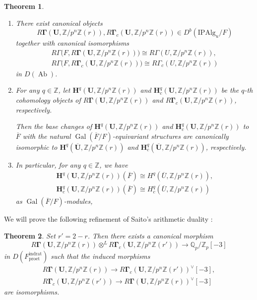 \documentclass{amsart}
\newtheorem{Thm}{Theorem}[subsection]
\theoremstyle{remark}
\numberwithin{equation}{subsection}
\newcommand{\tensor}{\mathbin{\otimes}}
\newcommand{\closure}[1]{\overline{#1}}
\newcommand{\Z}{\mathbb{Z}}
\newcommand{\Q}{\mathbb{Q}}
\newcommand{\et}{\mathrm{et}}
\newcommand{\rat}{\mathrm{rat}}
\newcommand{\ind}{\mathrm{ind}}
\newcommand{\pro}{\mathrm{pro}}
\newcommand{\Alg}{\mathrm{Alg}}
\newcommand{\Ind}{\mathrm{I}}
\newcommand{\Pro}{\mathrm{P}}
\newcommand{\alg}[1]{\mathbf{#1}}
\DeclareMathOperator{\Gal}{Gal}
\DeclareMathOperator{\Ab}{Ab}
\begin{document}
\begin{Thm} \label{0128} \mbox{}
	\begin{enumerate}
		\item \label{0129}
			There exist canonical objects
				\[
						R \alg{\Gamma}(\alg{U}, \Z / p^{n} \Z(r)),
						R \alg{\Gamma}_{c}(\alg{U}, \Z / p^{n} \Z(r))
					\in
						D^{b}(\Ind \Pro \Alg_{u} / F)
				\]
			together with canonical isomorphisms
				\begin{gather*}
							R \Gamma \bigl(
								F,
								R \alg{\Gamma}(\alg{U}, \Z / p^{n} \Z(r))
							\bigr)
						\cong
							R \Gamma(U, \Z / p^{n} \Z(r)),
					\\
							R \Gamma \bigl(
								F,
								R \alg{\Gamma}_{c}(\alg{U}, \Z / p^{n} \Z(r))
							\bigr)
						\cong
							R \Gamma_{c}(U, \Z / p^{n} \Z(r))
				\end{gather*}
			in $D(\Ab)$.
		\item \label{0130}
			For any $q \in \Z$,
			let $\alg{H}^{q}(\alg{U}, \Z / p^{n} \Z(r))$ and $\alg{H}^{q}_{c}(\alg{U}, \Z / p^{n} \Z(r))$
			be the $q$-th cohomology objects
			of $R \alg{\Gamma}(\alg{U}, \Z / p^{n} \Z(r))$ and $R \alg{\Gamma}_{c}(\alg{U}, \Z / p^{n} \Z(r))$,
			respectively.
			
			Then the base changes of $\alg{H}^{q}(\alg{U}, \Z / p^{n} \Z(r))$
			and $\alg{H}_{c}^{q}(\alg{U}, \Z / p^{n} \Z(r))$ to $\closure{F}$
			with the natural $\Gal(\closure{F} / F)$-equivariant structures
			are canonically isomorphic to
			$\alg{H}^{q}(\closure{\alg{U}}, \Z / p^{n} \Z(r))$
			and $\alg{H}_{c}^{q}(\closure{\alg{U}}, \Z / p^{n} \Z(r))$,
			respectively.
		\item \label{0131}
			In particular, for any $q \in \Z$, we have
				\begin{gather*}
							\alg{H}^{q}(\alg{U}, \Z / p^{n} \Z(r))(\closure{F})
						\cong
							H^{q}(\closure{U}, \Z / p^{n} \Z(r)),
					\\
							\alg{H}^{q}_{c}(\alg{U}, \Z / p^{n} \Z(r))(\closure{F})
						\cong
							H^{q}_{c}(\closure{U}, \Z / p^{n} \Z(r))
				\end{gather*}
			as $\Gal(\closure{F} / F)$-modules,
	\end{enumerate}
\end{Thm}

We will prove the following refinement of Saito's arithmetic duality
\cite{Sai86,Sai87}:

\begin{Thm} \label{0132}
	Set $r' = 2 - r$.
	Then there exists a canonical morphism
		\[
					R \alg{\Gamma}(\alg{U}, \Z / p^{n} \Z(r))
				\tensor^{L}
					R \alg{\Gamma}_{c}(\alg{U}, \Z / p^{n} \Z(r'))
			\to
				\Q_{p} / \Z_{p}[-3]
		\]
	in $D(F^{\ind\rat}_{\pro\et})$ such that the induced morphisms
		\begin{gather*}
					R \alg{\Gamma}(\alg{U}, \Z / p^{n} \Z(r))
				\to
					R \alg{\Gamma}_{c}(\alg{U}, \Z / p^{n} \Z(r'))^{\vee}[-3],
			\\
					R \alg{\Gamma}_{c}(\alg{U}, \Z / p^{n} \Z(r'))
				\to
					R \alg{\Gamma}(\alg{U}, \Z / p^{n} \Z(r))^{\vee}[-3]
		\end{gather*}
	are isomorphisms.
\end{Thm}
\end{document}
